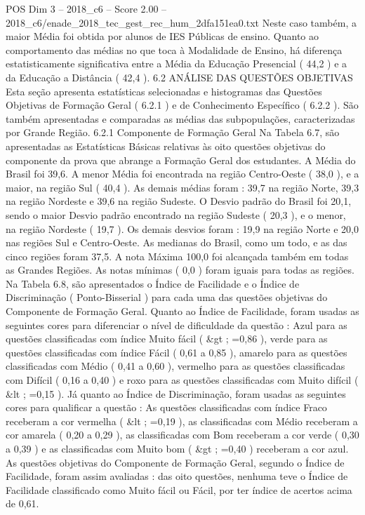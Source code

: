 \begin{textsample}{POS Dim 3 – 2018\_c6 – Score 2.00 – 2018\_c6/enade\_2018\_tec\_gest\_rec\_hum\_2dfa151ea0.txt}
Neste caso também, a maior Média foi obtida por alunos de IES Públicas de ensino.
Quanto ao comportamento das médias no que toca à Modalidade de Ensino, há diferença estatisticamente significativa entre a Média da Educação Presencial ( 44,2 ) e a da Educação a Distância ( 42,4 ). 6.2 ANÁLISE DAS QUESTÕES OBJETIVAS Esta seção apresenta estatísticas selecionadas e histogramas das Questões Objetivas de Formação Geral ( 6.2.1 ) e de Conhecimento Específico ( 6.2.2 ).
São também apresentadas e comparadas as médias das subpopulações, caracterizadas por Grande Região. 6.2.1 Componente de Formação Geral Na Tabela 6.7, são apresentadas as Estatísticas Básicas relativas às oito questões objetivas do componente da prova que abrange a Formação Geral dos estudantes.
A Média do Brasil foi 39,6.
A menor Média foi encontrada na região Centro-Oeste ( 38,0 ), e a maior, na região Sul ( 40,4 ).
As demais médias foram : 39,7 na região Norte, 39,3 na região Nordeste e 39,6 na região Sudeste.
O Desvio padrão do Brasil foi 20,1, sendo o maior Desvio padrão encontrado na região Sudeste ( 20,3 ), e o menor, na região Nordeste ( 19,7 ).
Os demais desvios foram : 19,9 na região Norte e 20,0 nas regiões Sul e Centro-Oeste.
As medianas do Brasil, como um todo, e as das cinco regiões foram 37,5.
A nota Máxima 100,0 foi alcançada também em todas as Grandes Regiões.
As notas mínimas ( 0,0 ) foram iguais para todas as regiões.
Na Tabela 6.8, são apresentados o Índice de Facilidade e o Índice de Discriminação ( Ponto-Bisserial ) para cada uma das questões objetivas do Componente de Formação Geral.
Quanto ao Índice de Facilidade, foram usadas as seguintes cores para diferenciar o nível de dificuldade da questão : Azul para as questões classificadas com índice Muito fácil ( \&gt ; =0,86 ), verde para as questões classificadas com índice Fácil ( 0,61 a 0,85 ), amarelo para as questões classificadas com Médio ( 0,41 a 0,60 ), vermelho para as questões classificadas com Difícil ( 0,16 a 0,40 ) e roxo para as questões classificadas com Muito difícil ( \&lt ; =0,15 ).
Já quanto ao Índice de Discriminação, foram usadas as seguintes cores para qualificar a questão : As questões classificadas com índice Fraco receberam a cor vermelha ( \&lt ; =0,19 ), as classificadas com Médio receberam a cor amarela ( 0,20 a 0,29 ), as classificadas com Bom receberam a cor verde ( 0,30 a 0,39 ) e as classificadas com Muito bom ( \&gt ; =0,40 ) receberam a cor azul.
As questões objetivas do Componente de Formação Geral, segundo o Índice de Facilidade, foram assim avaliadas : das oito questões, nenhuma teve o Índice de Facilidade classificado como Muito fácil ou Fácil, por ter índice de acertos acima de 0,61.

\end{textsample}
